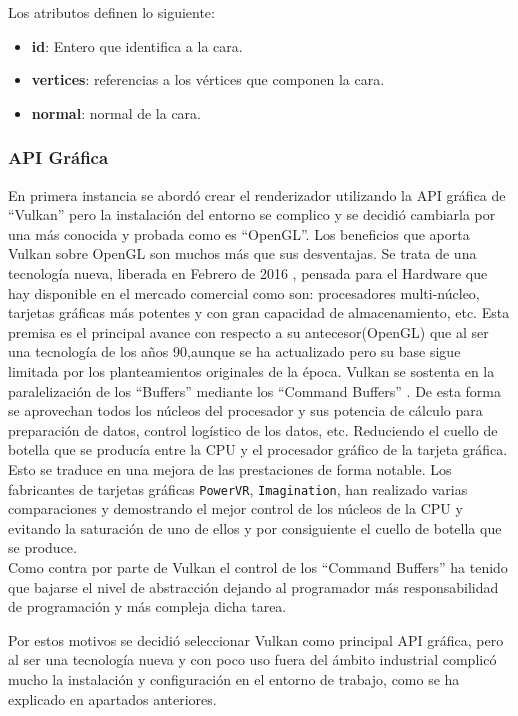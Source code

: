 Los atributos definen lo siguiente:
\begin{itemize}
	\item \textbf{id}: Entero que identifica a la cara.
	\item \textbf{vertices}: referencias a los vértices que componen la cara.
	\item \textbf{normal}: normal de la cara.
	
\end{itemize}


\subsubsection{API Gráfica}
En primera instancia se abordó crear el renderizador utilizando la API gráfica de ``Vulkan''  pero la instalación del entorno se complico y se decidió cambiarla por una más conocida y probada como es ``OpenGL''. Los beneficios que aporta Vulkan sobre OpenGL son muchos más que sus desventajas. Se trata de una tecnología nueva, liberada en Febrero de 2016 \cite{KhronosReleasesVulkan2016}, pensada para el  Hardware que hay disponible en el mercado comercial como son: procesadores multi-núcleo, tarjetas gráficas más potentes y con gran capacidad de almacenamiento, etc. Esta premisa es el principal avance con respecto a su antecesor(OpenGL) que al ser una tecnología de los años 90,aunque se ha actualizado pero su base sigue limitada por los planteamientos originales de la época. Vulkan se sostenta en la paralelización de los ``Buffers'' mediante los ``Command Buffers'' \cite{tristanlorachSiggraph2016Vulkan17:36:01UTC}.  De esta forma se aprovechan todos los núcleos del procesador y sus potencia de cálculo para preparación de datos, control logístico de los datos, etc. Reduciendo el cuello de botella que se producía entre la CPU y el procesador gráfico de la tarjeta gráfica. Esto se traduce en una mejora de las prestaciones de forma notable. Los fabricantes de tarjetas gráficas \texttt{PowerVR}, \texttt{Imagination}, han realizado varias comparaciones \cite{VulkanVsOpenGL2017a} y demostrando el mejor control de los núcleos de la CPU y evitando la saturación de uno de ellos y por consiguiente el cuello de botella que se produce. \\

Como contra por parte de Vulkan el control de los ``Command Buffers'' ha tenido que bajarse el nivel de abstracción dejando al programador más responsabilidad de programación y más compleja dicha tarea.


Por estos motivos se decidió seleccionar Vulkan como principal API gráfica, pero al ser una tecnología nueva y con poco uso fuera del ámbito industrial complicó mucho la instalación y configuración en el entorno de trabajo, como se ha explicado en apartados anteriores.\\

